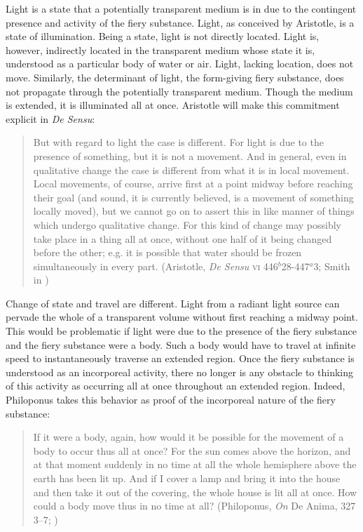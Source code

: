 Light is a state that a potentially transparent medium is in due to the contingent presence and activity of the fiery substance. Light, as conceived by Aristotle, is a state of illumination. Being a state, light is not directly located. Light is, however, indirectly located in the transparent medium whose state it is, understood as a particular body of water or air. Light, lacking location, does not move. Similarly, the determinant of light, the form-giving fiery substance, does not propagate through the potentially transparent medium. Though the medium is extended, it is illuminated all at once. Aristotle will make this commitment explicit in \emph{De Sensu}:
\begin{quote}
	But with regard to light the case is different. For light is due to the presence of something, but it is not a movement. And in general, even in qualitative change the case is different from what it is in local movement. Local movements, of course, arrive first at a point midway before reaching their goal (and sound, it is currently believed, is a movement of something locally moved), but we cannot go on to assert this in like manner of things which undergo qualitative change. For this kind of change may possibly take place in a thing all at once, without one half of it being changed before the other; e.g. it is possible that water should be frozen simultaneously in every part. (Aristotle, \emph{De Sensu} \textsc{vi} 446\( ^{b} \)28-447\( ^{a} \)3; Smith in \citealt[63]{Barnes:1984uq})
\end{quote}

Change of state and travel are different. Light from a radiant light source can pervade the whole of a transparent volume without first reaching a midway point. This would be problematic if light were due to the presence of the fiery substance and the fiery substance were a body. Such a body would have to travel at infinite speed to instantaneously traverse an extended region. Once the fiery substance is understood as an incorporeal activity, there no longer is any obstacle to thinking of this activity as occurring all at once throughout an extended region. Indeed, Philoponus takes this behavior as proof of the incorporeal nature of the fiery substance:
\begin{quote}
	If it were a body, again, how would it be possible for the movement of a body to occur thus all at once? For the sun comes above the horizon, and at that moment suddenly in no time at all the whole hemisphere above the earth has been lit up. And if I cover a lamp and bring it into the house and then take it out of the covering, the whole house is lit all at once. How could a body move thus in no time at all? (Philoponus, \emph{On} De Anima, 327 3--7; \citealt[11]{Charlton:2005fk})
\end{quote}


